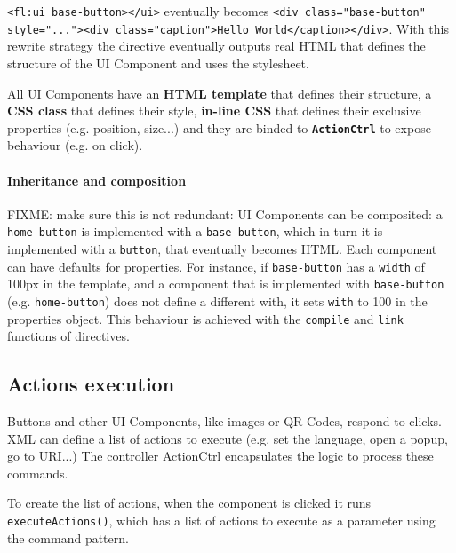 \lstinline$<fl:ui base-button></ui>$ eventually becomes \lstinline$<div class="base-button" style="..."><div class="caption">Hello World</caption></div>$. 
With this rewrite strategy the directive eventually outputs real \ac{HTML} that defines the structure of the UI Component and uses the stylesheet.

All UI Components have an  \textbf{\ac{HTML} template} that defines their structure, a \textbf{\ac{CSS} class} that defines their style, \textbf{in-line \ac{CSS}} that defines their exclusive properties (e.g. position, size...) and they are binded to \textbf{\texttt{ActionCtrl}} to expose behaviour (e.g. on click).
\FloatBarrier

\paragraph{Inheritance and composition} FIXME: make sure this is not redundant:  UI Components can be composited: a \texttt{home-button} is implemented with a \texttt{base-button}, which in turn it is implemented with a \texttt{button}, that eventually becomes \ac{HTML}.
Each component can have defaults for properties.
For instance, if \texttt{base-button} has a \texttt{width} of 100px in the template, and a component that is implemented with \texttt{base-button} (e.g. \texttt{home-button}) does not define a different with, it sets \texttt{with} to 100 in the properties object.
This behaviour is achieved with the \texttt{compile} and \texttt{link} functions of directives.

\subsection{Actions execution}
Buttons and other UI Components, like images or QR Codes, respond to clicks.
\ac{XML} can define a list of actions to execute (e.g. set the language, open a popup, go to \ac{URI}...)
The controller ActionCtrl encapsulates the logic to process these commands.





To create the list of actions, when the component is clicked it runs \texttt{executeActions()}, which has a list of actions to execute as a parameter using the command pattern.

